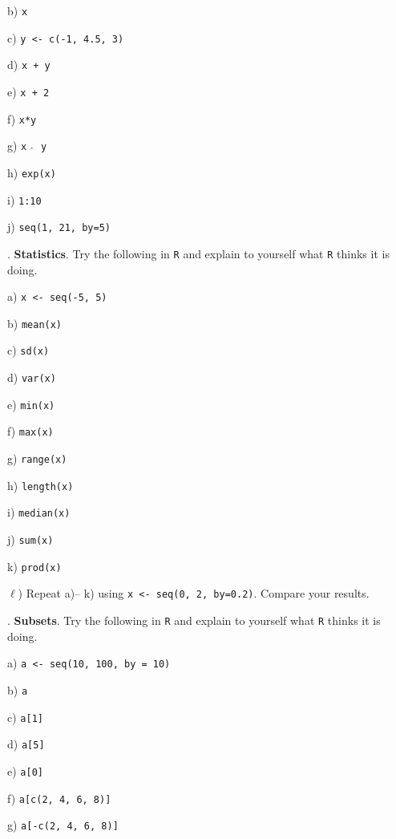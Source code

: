 \documentclass[10pt]{article}
\newcounter{EX}\setcounter{EX}{1}
\newcommand{\EXERCISE}{\arabic{EX}.\stepcounter{EX} }
\begin{document}
\SUBX b) \texttt{x}
\BSK

\SUBX c) \texttt{y <- c(-1, 4.5, 3)}
\BSK

\SUBX d) \texttt{x + y}
\BSK

\SUBX e) \texttt{x + 2}
\BSK

\SUBX f) \texttt{x*y}
\BSK

\SUBX g) \texttt{x  $\widehat{\hspace{3pt}}$  y}
\BSK

\SUBX h) \texttt{exp(x)}
\BSK

\SUBX i) \texttt{1:10}
\BSK

\SUBX j) \texttt{seq(1, 21, by=5)}
\BSK

\vfill
\eject

\EXERCISE \textbf{Statistics}.
Try the following in \texttt{R} and explain to yourself
what \texttt{R} thinks it is doing.

\SUBX a) \texttt{x <- seq(-5, 5)} %
\BSK

\SUBX b) \texttt{mean(x)}
\BSK

\SUBX c) \texttt{sd(x)}
\BSK

\SUBX d) \texttt{var(x)}
\BSK

\SUBX e) \texttt{min(x)}
\BSK

\SUBX f) \texttt{max(x)}
\BSK

\SUBX g) \texttt{range(x)}
\BSK

\SUBX h) \texttt{length(x)}
\BSK

\SUBX i) \texttt{median(x)}
\BSK

\SUBX j) \texttt{sum(x)}
\BSK

\SUBX k) \texttt{prod(x)}
\BSK

\SUBX $\ell$) Repeat a)-- k) using \texttt{x <- seq(0, 2, by=0.2)}.  
Compare your results.
\vspace{.6in}

\EXERCISE \textbf{Subsets}.  Try the following in \texttt{R} and explain to yourself
what \texttt{R} thinks it is doing.

\SUBX a) \texttt{a <- seq(10, 100, by = 10)}
\BSK

\SUBX b) \texttt{a}
\BSK

\SUBX c) \texttt{a[1]}
\BSK

\SUBX d) \texttt{a[5]}
\BSK

\SUBX e) \texttt{a[0]}
\BSK

\SUBX f) \texttt{a[c(2, 4, 6, 8)]}
\BSK

\SUBX g) \texttt{a[-c(2, 4, 6, 8)]}
\BSK
\end{document}
